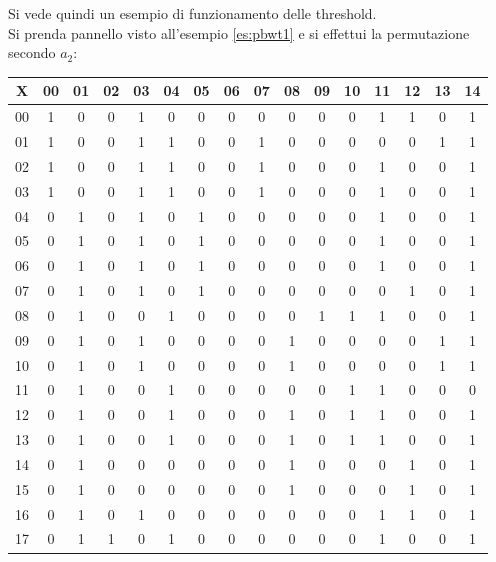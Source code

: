 \begin{esempio}
  \label{es:thr}
  Si vede quindi un esempio di funzionamento delle threshold.\\
  Si prenda pannello visto all'esempio \ref{es:pbwt1} e si effettui la
  permutazione secondo $a_2$:
  \begin{table}[H]
    \centering
    \footnotesize
    \begin{tabular}{c|cc|c|cccccccccccc}
      X & 00 & 01 & 02 & 03 & 04 & 05 & 06 & 07 & 08 & 09 & 10 & 11 & 12 & 13
      & 14 \\
      \hline
      00 & 1 & 0 & 0 & 1 & 0 & 0 & 0 & 0 & 0 & 0 & 0 & 1 & 1 & 0 & 1 \\
      01 & 1 & 0 & 0 & 1 & 1 & 0 & 0 & 1 & 0 & 0 & 0 & 0 & 0 & 1 & 1 \\
      02 & 1 & 0 & 0 & 1 & 1 & 0 & 0 & 1 & 0 & 0 & 0 & 1 & 0 & 0 & 1 \\
      03 & 1 & 0 & 0 & 1 & 1 & 0 & 0 & 1 & 0 & 0 & 0 & 1 & 0 & 0 & 1 \\
      04 & 0 & 1 & 0 & 1 & 0 & 1 & 0 & 0 & 0 & 0 & 0 & 1 & 0 & 0 & 1 \\
      05 & 0 & 1 & 0 & 1 & 0 & 1 & 0 & 0 & 0 & 0 & 0 & 1 & 0 & 0 & 1 \\
      06 & 0 & 1 & 0 & 1 & 0 & 1 & 0 & 0 & 0 & 0 & 0 & 1 & 0 & 0 & 1 \\
      07 & 0 & 1 & 0 & 1 & 0 & 1 & 0 & 0 & 0 & 0 & 0 & 0 & 1 & 0 & 1 \\
      08 & 0 & 1 & 0 & 0 & 1 & 0 & 0 & 0 & 0 & 1 & 1 & 1 & 0 & 0 & 1 \\
      09 & 0 & 1 & 0 & 1 & 0 & 0 & 0 & 0 & 1 & 0 & 0 & 0 & 0 & 1 & 1 \\
      10 & 0 & 1 & 0 & 1 & 0 & 0 & 0 & 0 & 1 & 0 & 0 & 0 & 0 & 1 & 1 \\
      11 & 0 & 1 & 0 & 0 & 1 & 0 & 0 & 0 & 0 & 0 & 1 & 1 & 0 & 0 & 0 \\
      12 & 0 & 1 & 0 & 0 & 1 & 0 & 0 & 0 & 1 & 0 & 1 & 1 & 0 & 0 & 1 \\
      13 & 0 & 1 & 0 & 0 & 1 & 0 & 0 & 0 & 1 & 0 & 1 & 1 & 0 & 0 & 1 \\
      14 & 0 & 1 & 0 & 0 & 0 & 0 & 0 & 0 & 1 & 0 & 0 & 0 & 1 & 0 & 1 \\
      15 & 0 & 1 & 0 & 0 & 0 & 0 & 0 & 0 & 1 & 0 & 0 & 0 & 1 & 0 & 1 \\
      16 & 0 & 1 & 0 & 1 & 0 & 0 & 0 & 0 & 0 & 0 & 0 & 1 & 1 & 0 & 1 \\
      17 & 0 & 1 & 1 & 0 & 1 & 0 & 0 & 0 & 0 & 0 & 0 & 1 & 0 & 0 & 1 \\

\end{tabular}
\end{table}
\end{esempio}

